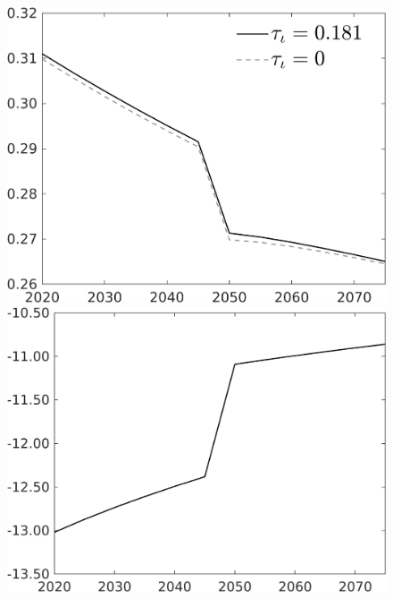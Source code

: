 \begin{figure}[h!!]
\begin{minipage}[]{0.32\textwidth}
	\end{minipage}			
	\begin{minipage}[]{0.32\textwidth}
		\includegraphics[width=1\textwidth]{../../codding_model/own_basedOnFried/optimalPol_010922_revision/figures/all_13Sept22/CompTauf_bytaul_Reg0_sn_spillover0_nsk0_xgr0_knspil0_sep0_LFlimit1_emsbase0_countec0_GovRev0_etaa0.79_lgd1.png}
	\end{minipage}	
	\begin{minipage}[]{0.32\textwidth}
		\includegraphics[width=1\textwidth]{../../codding_model/own_basedOnFried/optimalPol_010922_revision/figures/all_13Sept22/CompTaufPER_bytaul_Reg0_GFF_spillover0_nsk0_xgr0_knspil0_sep0_LFlimit1_emsbase0_countec0_GovRev0_etaa0.79_lgd0.png}

\end{minipage}
\end{figure}
